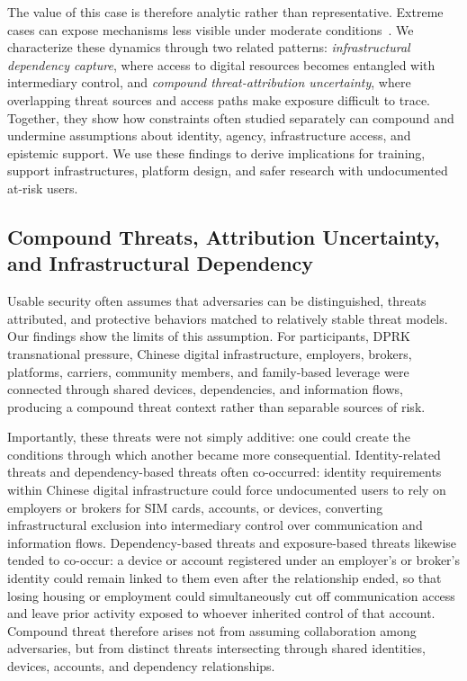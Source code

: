 \documentclass[conference,compsoc]{IEEEtran}
\begin{document}
The value of this case is therefore analytic rather than representative. Extreme cases can expose mechanisms less visible under moderate conditions~\cite{flyvbjerg2004five}. We characterize these dynamics through two related patterns: \emph{infrastructural dependency capture}, where access to digital resources becomes entangled with intermediary control, and \emph{compound threat-attribution uncertainty}, where overlapping threat sources and access paths make exposure difficult to trace. Together, they show how constraints often studied separately can compound and undermine assumptions about identity, agency, infrastructure access, and epistemic support. We use these findings to derive implications for training, support infrastructures, platform design, and safer research with undocumented at-risk users.


\subsection{Compound Threats, Attribution Uncertainty, and Infrastructural Dependency}

Usable security often assumes that adversaries can be distinguished, threats attributed, and protective behaviors matched to relatively stable threat models. Our findings show the limits of this assumption. For participants, DPRK transnational pressure, Chinese digital infrastructure, employers, brokers, platforms, carriers, community members, and family-based leverage were connected through shared devices, dependencies, and information flows, producing a compound threat context rather than separable sources of risk.

Importantly, these threats were not simply additive: one could create the conditions through which another became more consequential. Identity-related threats and dependency-based threats often co-occurred: identity requirements within Chinese digital infrastructure could force undocumented users to rely on employers or brokers for SIM cards, accounts, or devices, converting infrastructural exclusion into intermediary control over communication and information flows. Dependency-based threats and exposure-based threats likewise tended to co-occur: a device or account registered under an employer's or broker's identity could remain linked to them even after the relationship ended, so that losing housing or employment could simultaneously cut off communication access and leave prior activity exposed to whoever inherited control of that account. Compound threat therefore arises not from assuming collaboration among adversaries, but from distinct threats intersecting through shared identities, devices, accounts, and dependency relationships.
\end{document}
